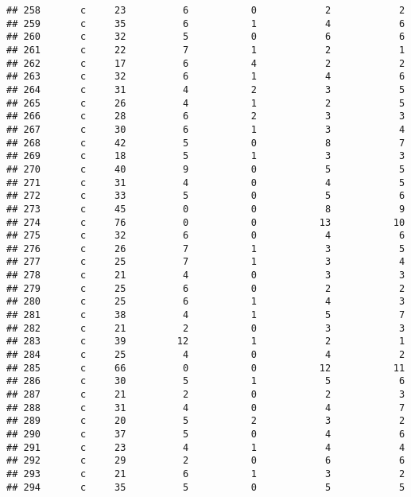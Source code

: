 \documentclass[
]{article}
\begin{document}
\begin{verbatim}
## 258       c     23          6           0            2            2
## 259       c     35          6           1            4            6
## 260       c     32          5           0            6            6
## 261       c     22          7           1            2            1
## 262       c     17          6           4            2            2
## 263       c     32          6           1            4            6
## 264       c     31          4           2            3            5
## 265       c     26          4           1            2            5
## 266       c     28          6           2            3            3
## 267       c     30          6           1            3            4
## 268       c     42          5           0            8            7
## 269       c     18          5           1            3            3
## 270       c     40          9           0            5            5
## 271       c     31          4           0            4            5
## 272       c     33          5           0            5            6
## 273       c     45          0           0            8            9
## 274       c     76          0           0           13           10
## 275       c     32          6           0            4            6
## 276       c     26          7           1            3            5
## 277       c     25          7           1            3            4
## 278       c     21          4           0            3            3
## 279       c     25          6           0            2            2
## 280       c     25          6           1            4            3
## 281       c     38          4           1            5            7
## 282       c     21          2           0            3            3
## 283       c     39         12           1            2            1
## 284       c     25          4           0            4            2
## 285       c     66          0           0           12           11
## 286       c     30          5           1            5            6
## 287       c     21          2           0            2            3
## 288       c     31          4           0            4            7
## 289       c     20          5           2            3            2
## 290       c     37          5           0            4            6
## 291       c     23          4           1            4            4
## 292       c     29          2           0            6            6
## 293       c     21          6           1            3            2
## 294       c     35          5           0            5            5

\end{verbatim}
\end{document}
